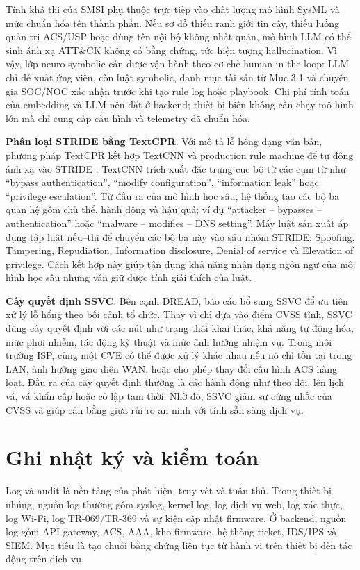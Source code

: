 \documentclass[../DoAn.tex]{subfiles}
\begin{document}
Tính khả thi của SMSI phụ thuộc trực tiếp vào chất lượng mô hình SysML và mức chuẩn hóa tên thành phần. Nếu sơ đồ thiếu ranh giới tin cậy, thiếu luồng quản trị ACS/USP hoặc dùng tên nội bộ không nhất quán, mô hình LLM có thể sinh ánh xạ ATT\&CK không có bằng chứng, tức hiện tượng hallucination. Vì vậy, lớp neuro-symbolic cần được vận hành theo cơ chế human-in-the-loop: LLM chỉ đề xuất ứng viên, còn luật symbolic, danh mục tài sản từ Mục 3.1 và chuyên gia SOC/NOC xác nhận trước khi tạo rule log hoặc playbook. Chi phí tính toán của embedding và LLM nên đặt ở backend; thiết bị biên không cần chạy mô hình lớn mà chỉ cung cấp cấu hình và telemetry đã chuẩn hóa.

\textbf{Phân loại STRIDE bằng TextCPR}. Với mô tả lỗ hổng dạng văn bản, phương pháp TextCPR kết hợp TextCNN và production rule machine để tự động ánh xạ vào STRIDE \cite{stridepasta2022}. TextCNN trích xuất đặc trưng cục bộ từ các cụm từ như ``bypass authentication'', ``modify configuration'', ``information leak'' hoặc ``privilege escalation''. Từ đầu ra của mô hình học sâu, hệ thống tạo các bộ ba quan hệ gồm chủ thể, hành động và hậu quả; ví dụ ``attacker -- bypasses -- authentication'' hoặc ``malware -- modifies -- DNS setting''. Máy luật sản xuất áp dụng tập luật nếu--thì để chuyển các bộ ba này vào sáu nhóm STRIDE: Spoofing, Tampering, Repudiation, Information disclosure, Denial of service và Elevation of privilege. Cách kết hợp này giúp tận dụng khả năng nhận dạng ngôn ngữ của mô hình học sâu nhưng vẫn giữ được tính giải thích của luật.

\textbf{Cây quyết định SSVC}. Bên cạnh DREAD, báo cáo bổ sung SSVC \cite{attackiot2023} để ưu tiên xử lý lỗ hổng theo bối cảnh tổ chức. Thay vì chỉ dựa vào điểm CVSS tĩnh, SSVC dùng cây quyết định với các nút như trạng thái khai thác, khả năng tự động hóa, mức phơi nhiễm, tác động kỹ thuật và mức ảnh hưởng nhiệm vụ. Trong môi trường ISP, cùng một CVE có thể được xử lý khác nhau nếu nó chỉ tồn tại trong LAN, ảnh hưởng giao diện WAN, hoặc cho phép thay đổi cấu hình ACS hàng loạt. Đầu ra của cây quyết định thường là các hành động như theo dõi, lên lịch vá, vá khẩn cấp hoặc cô lập tạm thời. Nhờ đó, SSVC giảm sự cứng nhắc của CVSS và giúp cân bằng giữa rủi ro an ninh với tính sẵn sàng dịch vụ.


\section{Ghi nhật ký và kiểm toán}
Log và audit là nền tảng của phát hiện, truy vết và tuân thủ. Trong thiết bị nhúng, nguồn log thường gồm syslog, kernel log, log dịch vụ web, log xác thực, log Wi-Fi, log TR-069/TR-369 và sự kiện cập nhật firmware. Ở backend, nguồn log gồm API gateway, ACS, AAA, kho firmware, hệ thống ticket, IDS/IPS và SIEM. Mục tiêu là tạo chuỗi bằng chứng liên tục từ hành vi trên thiết bị đến tác động trên dịch vụ.
\end{document}
